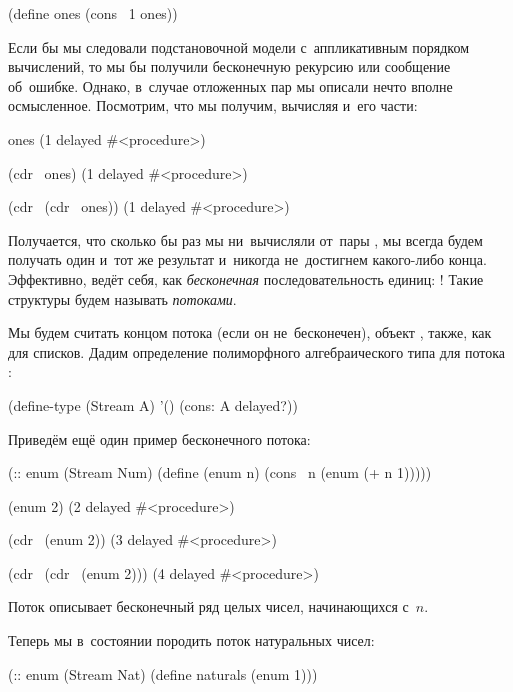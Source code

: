 \begin{Definition}
(define ones (cons~ 1 ones))
\end{Definition}

Если бы мы следовали подстановочной модели с~аппликативным порядком вычислений, то мы бы получили бесконечную рекурсию или сообщение об~ошибке. Однако, в~случае отложенных пар мы описали нечто вполне осмысленное. Посмотрим, что мы получим, вычисляя  и~его части:

\REPL
  {ones}
  {(1 delayed \#<procedure>)}

\REPL
  {(cdr~ ones)}
  {(1 delayed \#<procedure>)}

\REPL
  {(cdr~ (cdr~ ones))}
  {(1 delayed \#<procedure>)}

Получается, что сколько бы раз мы ни~вычисляли  от~пары , мы всегда будем получать один и~тот же результат и~никогда не~достигнем какого-либо конца. Эффективно,  ведёт себя, как \emph{бесконечная} последовательность единиц: ! Такие структуры будем называть \emph{потоками}.

Мы будем считать концом потока (если он не~бесконечен), объект , также, как для списков. Дадим определение полиморфного алгебраического типа для потока  :

\begin{Definition}
(define-type (Stream A)
  '()
  (cons: A delayed?))
\end{Definition}

Приведём ещё один пример бесконечного потока:

\begin{Definition}[emph={n}]
(:: enum (Stream Num)
 (define (enum n)
   (cons~ n (enum (+ n 1)))))
\end{Definition}

\REPL
  {(enum 2)}
  {(2 delayed \#<procedure>)}

\REPL
  {(cdr~ (enum 2))}
  {(3 delayed \#<procedure>)}

\REPL
  {(cdr~ (cdr~ (enum 2)))}
  {(4 delayed \#<procedure>)}

Поток  описывает бесконечный ряд целых чисел, начинающихся с~$n$.

Теперь мы в~состоянии породить поток натуральных чисел:
\begin{Definition}
(:: enum (Stream Nat)
  (define naturals (enum 1)))
\end{Definition}
\newpage

